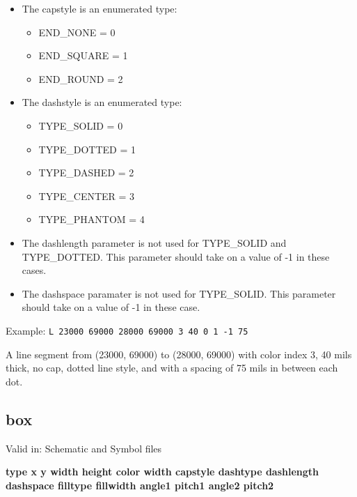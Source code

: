 \documentclass{article}
\begin{document}
\begin{itemize}
\item The capstyle is an enumerated type: 
\begin{itemize}
	\item END\_NONE = 0
	\item END\_SQUARE = 1
	\item END\_ROUND = 2
\end{itemize}
\item The dashstyle is an enumerated type: 
\begin{itemize}
	\item TYPE\_SOLID = 0 
	\item TYPE\_DOTTED = 1
	\item TYPE\_DASHED = 2
	\item TYPE\_CENTER = 3
        \item TYPE\_PHANTOM = 4
\end{itemize}
\item The dashlength parameter is not used for TYPE\_SOLID and TYPE\_DOTTED.  
      This parameter should take on a value of -1 in these cases.
\item The dashspace paramater is not used for TYPE\_SOLID.
      This parameter should take on a value of -1 in these case.
\end{itemize}

Example:\newline
{\tt L 23000 69000 28000 69000 3 40 0 1 -1 75}

A line segment from (23000, 69000) to (28000, 69000) with color index 3, 
40 mils thick, no cap, dotted line style, and with a spacing of 75 mils 
in between each dot.


\subsection{box}

Valid in: Schematic and Symbol files

{\bf type x y width height color width capstyle dashtype dashlength dashspace filltype fillwidth angle1 pitch1 angle2 pitch2 }
\end{document}
